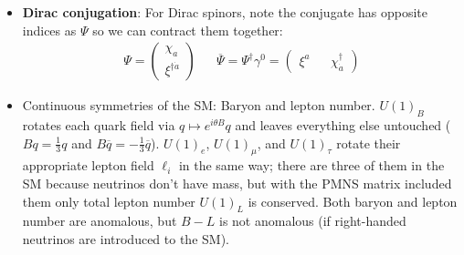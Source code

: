 \documentclass[11pt, oneside]{article}   	%
\theoremstyle{definition}
\numberwithin{equation}{subsection}		%
\begin{document}
\begin{itemize}
	\item \textbf{Dirac conjugation}: For Dirac spinors, note the conjugate has opposite indices as $\Psi$ so we can contract them together:
	\begin{align}
		\Psi = \begin{pmatrix} \chi_a \\ \xi^{\dagger\dot a}\end{pmatrix} && \overline\Psi = \Psi^\dagger\gamma^0 = \begin{pmatrix} \xi^a && \chi^\dagger_{\dot a} \end{pmatrix}
	\end{align}
	
	
	\item Continuous symmetries of the SM: Baryon and lepton number. $U(1)_B$ rotates each quark field via $q\mapsto e^{i\theta B} q$ and 
	leaves everything else untouched ($B q = \frac{1}{3} q$ and $B \overline q = -\frac{1}{3} \overline q$). $U(1)_e$, $U(1)_\mu$, and 
	$U(1)_\tau$ rotate their appropriate lepton field $\ell_i$ in the same way; there are three of them in the SM because neutrinos don't have 
	mass, but with the PMNS matrix included them only total lepton number $U(1)_L$ is conserved. Both baryon and lepton number are anomalous, 
	but $B - L$ is not anomalous (if right-handed neutrinos are introduced to the SM). 
	

\end{itemize}
\end{document}
